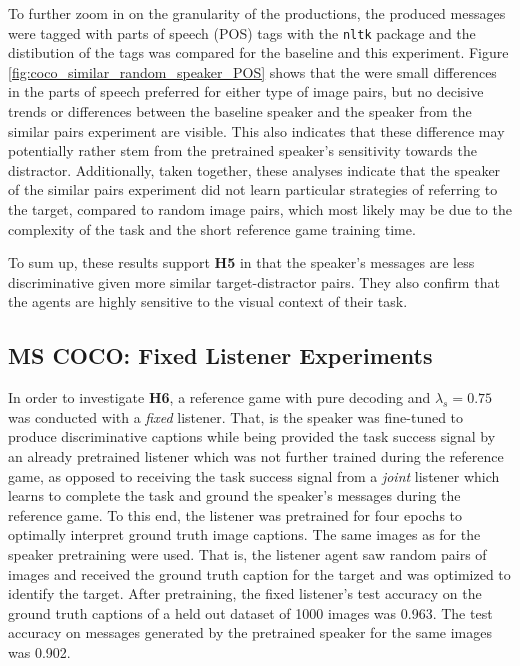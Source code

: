 To further zoom in on the granularity of the productions, the produced messages were tagged with parts of speech (POS) tags with the \texttt{nltk} package \parencite{bird2006nltk} and the distibution of the tags was compared for the baseline and this experiment. Figure \ref{fig:coco_similar_random_speaker_POS} shows that the were small differences in the parts of speech preferred for either type of image pairs, but no decisive trends or differences between the baseline speaker and the speaker from the similar pairs experiment are visible. This also indicates that these difference may potentially rather stem from the pretrained speaker's sensitivity towards the distractor. Additionally, taken together, these analyses indicate that the speaker of the similar pairs experiment did not learn particular strategies of referring to the target, compared to random image pairs, which most likely may be due to the complexity of the task and the short reference game training time.

To sum up, these results support \textbf{H5} in that the speaker's messages are less discriminative given more similar target-distractor pairs. They also confirm that the agents are highly sensitive to the visual context of their task.

\subsection{MS COCO: Fixed Listener Experiments}
\label{exp:coco_fixed_listener}
In order to investigate \textbf{H6}, a reference game with pure decoding and $\lambda_s=0.75$ was conducted with a \emph{fixed} listener. That, is the speaker was fine-tuned to produce discriminative captions while being provided the task success signal by an already pretrained listener which was not further trained during the reference game, as opposed to receiving the task success signal from a \emph{joint} listener which learns to complete the task and ground the speaker's messages during the reference game. To this end, the listener was pretrained for four epochs to optimally interpret ground truth image captions. The same images as for the speaker pretraining were used. That is, the listener agent saw random pairs of images and received the ground truth caption for the target and was optimized to identify the target. After pretraining, the fixed listener's test accuracy on the ground truth captions of a held out dataset of 1000 images was 0.963. The test accuracy on messages generated by the pretrained speaker for the same images was 0.902.

